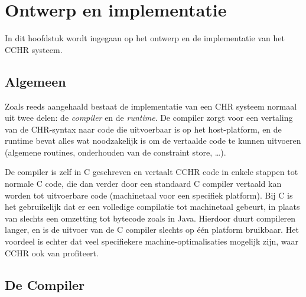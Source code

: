 \chapter{Ontwerp en implementatie} \label{chap:impl}

In dit hoofdstuk wordt ingegaan op het ontwerp en de implementatie van het CCHR systeem.

\section{Algemeen} \label{sec:impl}

Zoals reeds aangehaald bestaat de implementatie van een CHR systeem normaal uit twee delen: de {\em compiler} en de {\em runtime}. De compiler zorgt voor een vertaling van de CHR-syntax naar code die uitvoerbaar is op het host-platform, en de runtime bevat alles wat noodzakelijk is om de vertaalde code te kunnen uitvoeren (algemene routines, onderhouden van de constraint store, \ldots).

De compiler is zelf in C geschreven en vertaalt CCHR code in enkele stappen tot normale C code, die dan verder door een standaard C compiler vertaald kan worden tot uitvoerbare code (machinetaal voor een specifiek platform). Bij C is het gebruikelijk dat er een volledige compilatie tot machinetaal gebeurt, in plaats van slechts een omzetting tot bytecode zoals in Java. Hierdoor duurt compileren langer, en is de uitvoer van de C compiler slechts op \'e\'en platform bruikbaar. Het voordeel is echter dat veel specifiekere machine-optimalisaties mogelijk zijn, waar CCHR ook van profiteert.

\section{De Compiler} \label{sec:compiler}


